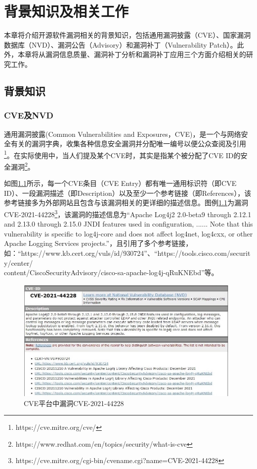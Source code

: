 \chapter{背景知识及相关工作}
本章将介绍开源软件漏洞相关的背景知识，包括通用漏洞披露（CVE）、国家漏洞数据库（NVD）、漏洞公告（Advisory）和漏洞补丁（Vulnerability Patch）。此外，本章将从漏洞信息质量、漏洞补丁分析和漏洞补丁应用三个方面介绍相关的研究工作。


\section{背景知识}

\subsection{CVE及NVD} 
通用漏洞披露(Common Vulnerabilities and Exposures，CVE)\cite{mitre2021:cve}，是一个与网络安全有关的漏洞字典，收集各种信息安全漏洞并分配唯一编号以便公众查阅及引用\footnote{https://cve.mitre.org/cve/}。在实际使用中，当人们提及某个CVE时，其实是指某个被分配了CVE ID的安全漏洞\footnote{https://www.redhat.com/en/topics/security/what-is-cve}。

如图\ref{fig:CVE-2021-44228}所示，每一个CVE条目（CVE Entry）都有唯一通用标识符（即CVE ID）、一段漏洞描述（即Description）以及至少一个参考链接（即References），该参考链接多为外部网站且包含与该漏洞相关的更详细的描述信息。图例\ref{fig:CVE-2021-44228}为漏洞CVE-2021-44228\footnote{https://cve.mitre.org/cgi-bin/cvename.cgi?name=CVE-2021-44228}，该漏洞的描述信息为“Apache Log4j2 2.0-beta9 through 2.12.1 and 2.13.0 through 2.15.0 JNDI features used in configuration, ...... Note that this vulnerability is specific to log4j-core and does not affect log4net, log4cxx, or other Apache Logging Services projects.”，且引用了多个参考链接，如：“https://www.kb.cert.org/vuls/id/930724”、“https://tools.cisco.com/security/center/\\content/CiscoSecurityAdvisory/cisco-sa-apache-log4j-qRuKNEbd”等。

\begin{figure}[!t]
    \centering
    \includegraphics[width=0.98\textwidth]{fig/CVE-2021-44228-2}
    \caption{CVE平台中漏洞CVE-2021-44228}\label{fig:CVE-2021-44228}
\end{figure}

